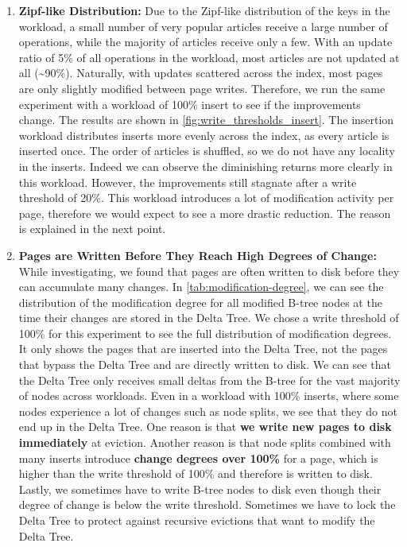 \begin{enumerate}
\item \textbf{Zipf-like Distribution:}
Due to the Zipf-like distribution of the keys in the workload, a small number of very popular articles receive a large number of operations, while the majority of articles receive only a few.
With an update ratio of 5\% of all operations in the workload, most articles are not updated at all (\textasciitilde 90\%).
Naturally, with updates scattered across the index, most pages are only slightly modified between page writes.
Therefore, we run the same experiment with a workload of 100\% insert to see if the improvements change.
The results are shown in \autoref{fig:write_thresholds_insert}.
The insertion workload distributes inserts more evenly across the index, as every article is inserted once.
The order of articles is shuffled, so we do not have any locality in the inserts.
Indeed we can observe the diminishing returns more clearly in this workload.
However, the improvements still stagnate after a write threshold of 20\%.
This workload introduces a lot of modification activity per page, therefore we would expect to see a more drastic reduction.
The reason is explained in the next point.
\item \textbf{Pages are Written Before They Reach High Degrees of Change:}
While investigating, we found that pages are often written to disk before they can accumulate many changes.
In \autoref{tab:modification-degree}, we can see the distribution of the modification degree for all modified B-tree nodes at the time their changes are stored in the Delta Tree.
We chose a write threshold of 100\% for this experiment to see the full distribution of modification degrees.
It only shows the pages that are inserted into the Delta Tree, not the pages that bypass the Delta Tree and are directly written to disk.
We can see that the Delta Tree only receives small deltas from the B-tree for the vast majority of nodes across workloads.
Even in a workload with 100\% inserts, where some nodes experience a lot of changes such as node splits, we see that they do not end up in the Delta Tree.
One reason is that \textbf{we write new pages to disk immediately} at eviction.
Another reason is that node splits combined with many inserts introduce \textbf{change degrees over 100\%} for a page, which is higher than the write threshold of 100\% and therefore is written to disk.
Lastly, we sometimes have to write B-tree nodes to disk even though their degree of change is below the write threshold.
Sometimes we have to lock the Delta Tree to protect against recursive evictions that want to modify the Delta Tree.

\end{enumerate}
